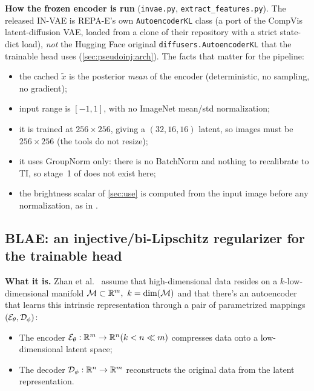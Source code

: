 \textbf{How the frozen encoder is run} (\texttt{invae.py}, \texttt{extract\_features.py}). The 
released IN-VAE is REPA-E's own \texttt{AutoencoderKL} class (a port of the CompVis latent-diffusion 
VAE, loaded from a clone of their repository with a strict state-dict load), \emph{not} the Hugging 
Face original \linebreak
\texttt{diffusers.AutoencoderKL} that the trainable head uses  
(\cref{sec:pseudoinj:arch}). The facts that matter for the pipeline:
\begin{itemize}[leftmargin=1.5em]
\item the cached $\tilde x$ is the posterior \emph{mean} of the encoder (deterministic, no sampling, 
      no gradient);
\item input range is $[-1,1]$, with no ImageNet mean/std normalization;
\item it is trained at $256\times256$, giving a $(32,16,16)$ latent, so images must be $256\times256$
      (the tools do not resize);
\item it uses GroupNorm only: there is no BatchNorm and nothing to recalibrate to TI, so stage~1 of
       does not exist here;
\item the brightness scalar of \cref{sec:use} is computed from the input image before any
      normalization, as in .
\end{itemize}

\subsection{BLAE: an injective/bi-Lipschitz regularizer for the trainable head}
\label{sec:pseudoinj:blae}
\textbf{What it is.} Zhan et al.\ \cite{zhan2026blae} assume that high-dimensional data resides
on a $k$-low-dimensional manifold $\mathcal{M} \subset \mathbb{R}^m,\ k = \dim(\mathcal{M})$ and that there's an autoencoder 
that learns this intrinsic representation through a pair of parametrized mappings 
$(\mathcal{E}_\theta,\mathcal{D}_\phi)$:
\begin{itemize}
\item The encoder $\mathcal{E}_\theta : \mathbb{R}^m \to \mathbb{R}^n (k < n \ll m)$ compresses data onto a low-dimensional 
      latent space;
\item The decoder $\mathcal{D}_\phi : \mathbb{R}^n \to \mathbb{R}^m$ reconstructs the original data from the latent 
representation.
\end{itemize}

